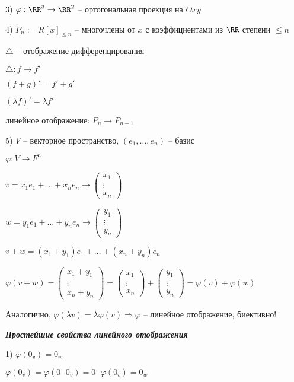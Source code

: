 3) $\varphi: \RR^3 \rightarrow \RR^2$ -- ортогональная проекция на $Oxy$

4) $P_n := R[x]_{\leq n}$ -- многочлены от $x$ с коэффициентами из $\RR$ степени $\leq n$

$\triangle$ -- отображение дифференцирования

$\triangle: f \rightarrow f'$

$(f + g)' = f' + g'$

$(\lambda f)' = \lambda f'$

линейное отображение: $P_n \rightarrow P_{n-1}$

5) $V$ -- векторное пространство, $(e_1, \dots, e_n)$ -- базис

$\varphi: V \rightarrow F^n$

$v = x_1 e_1 + \dots + x_n e_n \rightarrow \begin{pmatrix} x_1 \\ \vdots \\ x_n \end{pmatrix}$

$w = y_1 e_1 + \dots + y_n e_n \rightarrow \begin{pmatrix} y_1 \\ \vdots \\ y_n \end{pmatrix}$

$v + w = (x_1 + y_1) e_1 + \dots + (x_n + y_n) e_n$

$\varphi(v + w) = \begin{pmatrix} x_1 + y_1 \\ \vdots \\ x_n + y_n \end{pmatrix} = \begin{pmatrix} x_1 \\ \vdots \\ x_n \end{pmatrix} + \begin{pmatrix} y_1 \\ \vdots \\ y_n \end{pmatrix} = \varphi(v) + \varphi(w)$

Аналогично, $\varphi(\lambda v) = \lambda \varphi (v) \Rightarrow \varphi$ -- линейное отображение, биективно!

\bigskip
\textbf{\textit{Простейшие свойства линейного отображения}}

1) $\varphi(0_v) = 0_w$

$\varphi(0_v) = \varphi(0 \cdot 0_v) = 0 \cdot \varphi(0_v) = 0_w$

